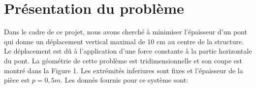 \documentclass{article}
\begin{document}


    \section{Présentation du problème}
    Dans le cadre de ce projet, nous avons cherché à minimiser l'épaisseur d'un pont qui donne un déplacement vertical maximal de 10 cm au centre de la structure. Le déplacement est dû à l'application d'une force constante à la partie horizontale du pont. La géométrie de cette problème est tridimensionnelle et son coupe est montré dans la Figure 1. %
    Les extrémités inferiures sont fixes et l'épaisseur de la pièce est $p = 0,5 m$.
    Les donnés fournis pour ce système sont:
\end{document}
